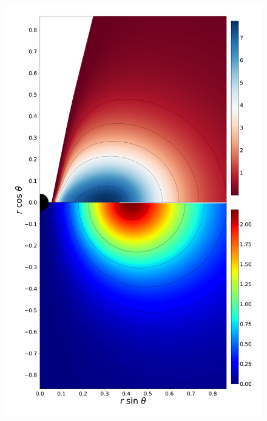 \documentclass[twocolumn,aps,showpacs,showkeys,prd,superscriptaddress,byrevtex, amsmath]{revtex4-1}
\begin{document}
\begin{figure}
\includegraphics[scale=0.12]{figures/fig5_VII_10.pdf}
\hspace{-0.2cm}
\\

\end{figure}
\end{document}

